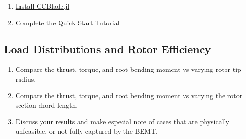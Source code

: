 \documentclass[11pt,twocolumn]{article}
\begin{document}
\begin{enumerate}[label=\roman*.]
	\item \href{https://flow.byu.edu/CCBlade.jl/stable/}{Install CCBlade.jl}
	\item Complete the \href{https://flow.byu.edu/CCBlade.jl/stable/tutorial/}{Quick Start Tutorial}
\end{enumerate}



\subsection{Load Distributions and Rotor Efficiency}

\begin{enumerate}[label=\roman*.]
	\item Compare the thrust, torque, and root bending moment vs varying rotor tip radius.
	\item Compare the thrust, torque, and root bending moment vs varying the rotor section chord length.
	\item Discuss your results and make especial note of cases that are physically unfeasible, or not fully captured by the BEMT.
\end{enumerate}
\end{document}
